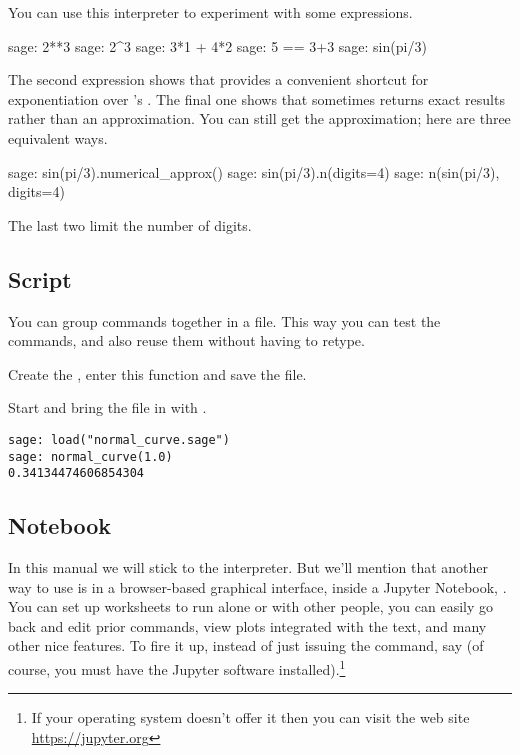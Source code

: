 You can use this interpreter to experiment with some expressions.
\begin{sagecommandline}
sage: 2**3                                                                      
sage: 2^3
sage: 3*1 + 4*2
sage: 5 == 3+3
sage: sin(pi/3)
\end{sagecommandline}
The second expression 
shows that \Sage{} provides a convenient shortcut for exponentiation over
\python's .
The final one
shows that \Sage{} sometimes returns exact results rather than an
approximation.
You can still get the approximation; here are three equivalent ways.
\begin{sagecommandline}
sage: sin(pi/3).numerical_approx()
sage: sin(pi/3).n(digits=4)
sage: n(sin(pi/3), digits=4)  
\end{sagecommandline}
The last two limit the number of digits.


\subsection{Script}
You can group \Sage{} commands together in a file.
This way you can test the commands, 
and also reuse them without having to retype.

Create the , 
enter this function and save the file.

\noindent
Start \Sage{} and bring the file in with .
\begin{lstlisting}[style=python]
sage: load("normal_curve.sage")
sage: normal_curve(1.0)
0.34134474606854304
\end{lstlisting}


\subsection{Notebook}
In this manual we will stick to the interpreter.
But we'll mention that another way to use \Sage{} is in   
a browser-based graphical interface, 
inside a Jupyter Notebook, \cite{JupyterTeam19}.
You can set up
worksheets to run alone or with other people, you can easily
go back and edit prior commands, view plots integrated with the text, 
and many other nice features.
To fire it up, instead of just issuing the 
command, say
(of course, you must have the Jupyter software
installed).\footnote{%
  If your operating system doesn't offer it then you can 
  visit the web site \protect\url{https://jupyter.org}}
\endinput
